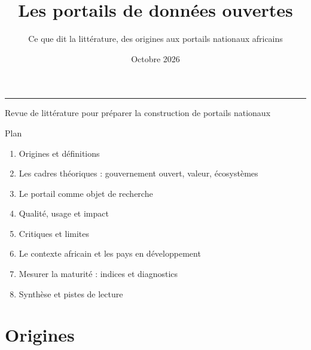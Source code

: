 \documentclass[11pt,aspectratio=169]{beamer}
\title{Les portails de données ouvertes}
\subtitle{Ce que dit la littérature, des origines aux portails nationaux africains}
\date{Octobre 2026}
\begin{document}
\begin{frame}[plain]
  \vfill
  {\inserttitle\par}
  \vspace{0.6em}
  {\large\insertsubtitle\par}
  \vspace{1.2em}
  {\color{bleu}\rule{4cm}{1.5pt}}\par
  \vspace{0.8em}
  {\small\textcolor{gris}{Revue de littérature pour préparer la construction de portails nationaux}}
  \vfill
\end{frame}

\begin{frame}{Plan}
  \begin{enumerate}
    \item Origines et définitions
    \item Les cadres théoriques : gouvernement ouvert, valeur, écosystèmes
    \item Le portail comme objet de recherche
    \item Qualité, usage et impact
    \item Critiques et limites
    \item Le contexte africain et les pays en développement
    \item Mesurer la maturité : indices et diagnostics
    \item Synthèse et pistes de lecture
  \end{enumerate}
\end{frame}

\section{Origines}
\end{document}
